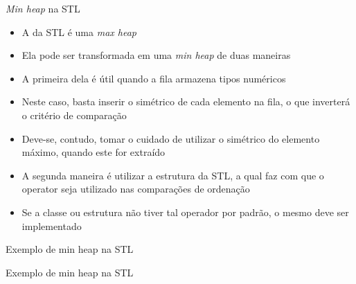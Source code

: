 \begin{frame}[fragile]{{\it Min heap} na STL}

    \begin{itemize}
        \item A  da STL é uma \textit{max heap}

        \item Ela pode ser transformada em uma \textit{min heap} de duas maneiras

        \item A primeira dela é útil quando a fila armazena tipos numéricos

        \item Neste caso, basta inserir o simétrico de cada elemento na fila, o que inverterá
            o critério de comparação

        \item Deve-se, contudo, tomar o cuidado de utilizar o simétrico do elemento máximo,
            quando este for extraído

        \item A segunda maneira é utilizar a estrutura  da STL, a qual 
            faz com que o operator  seja utilizado nas comparações de ordenação

        \item Se a classe ou estrutura não tiver tal operador por padrão, o mesmo deve ser
            implementado
    \end{itemize}

\end{frame}

\begin{frame}[fragile]{Exemplo de min heap na STL}
\end{frame}

\begin{frame}[fragile]{Exemplo de min heap na STL}
\end{frame}
